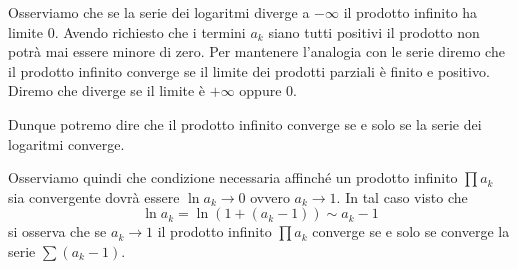 Osserviamo che se la serie dei logaritmi diverge a $-\infty$ il prodotto infinito
ha limite $0$. Avendo richiesto che i termini $a_k$ siano tutti positivi il prodotto
non potrà mai essere minore di zero. Per mantenere l'analogia con le serie diremo
che il prodotto infinito converge se il limite dei prodotti parziali è finito e positivo.
Diremo che diverge se il limite è $+\infty$ oppure $0$.

Dunque potremo dire che il prodotto infinito converge se e solo se la serie dei logaritmi converge.

Osserviamo quindi che condizione necessaria affinché un prodotto infinito
$\prod a_k$ sia convergente
dovrà essere $\ln a_k\to 0$ ovvero $a_k \to 1$. In tal caso visto che
\[
  \ln a_k = \ln (1+(a_k-1)) \sim a_k - 1
\]
si osserva che se $a_k\to 1$ il prodotto infinito $\prod a_k$ converge
se e solo se converge la serie $\sum (a_k-1)$.

